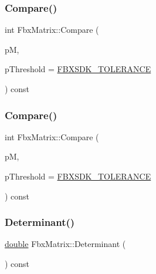 \subsubsection{\texorpdfstring{Compare()}{Compare()}\hspace{0.1cm}{\footnotesize\ttfamily [1/2]}}
{\footnotesize\ttfamily int Fbx\+Matrix\+::\+Compare (\begin{DoxyParamCaption}\item[{const \hyperlink{class_fbx_matrix}{Fbx\+Matrix}}]{pM,  }\item[{const \hyperlink{class_fbx_matrix_a01f8be57393e5d9973b23897c29d5520}{double}}]{p\+Threshold = {\ttfamily \hyperlink{fbxtypes_8h_acf3cd6f208edb42ad9c9abbc1f7feea0}{F\+B\+X\+S\+D\+K\+\_\+\+T\+O\+L\+E\+R\+A\+N\+CE}} }\end{DoxyParamCaption}) const}

\mbox{\label{class_fbx_matrix_af70d97ac4256207042f4aeb933bfae99}} 
\subsubsection{\texorpdfstring{Compare()}{Compare()}\hspace{0.1cm}{\footnotesize\ttfamily [2/2]}}
{\footnotesize\ttfamily int Fbx\+Matrix\+::\+Compare (\begin{DoxyParamCaption}\item[{const \hyperlink{class_fbx_a_matrix}{Fbx\+A\+Matrix}}]{pM,  }\item[{const \hyperlink{class_fbx_matrix_a01f8be57393e5d9973b23897c29d5520}{double}}]{p\+Threshold = {\ttfamily \hyperlink{fbxtypes_8h_acf3cd6f208edb42ad9c9abbc1f7feea0}{F\+B\+X\+S\+D\+K\+\_\+\+T\+O\+L\+E\+R\+A\+N\+CE}} }\end{DoxyParamCaption}) const}

\mbox{\label{class_fbx_matrix_add2807a6e072d224b95ec69f584a3600}} 
\subsubsection{\texorpdfstring{Determinant()}{Determinant()}}
{\footnotesize\ttfamily \hyperlink{class_fbx_matrix_a01f8be57393e5d9973b23897c29d5520}{double} Fbx\+Matrix\+::\+Determinant (\begin{DoxyParamCaption}{ }\end{DoxyParamCaption}) const}

